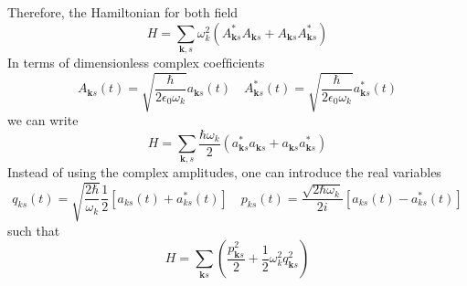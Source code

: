 \documentclass[../../../main.tex]{subfiles}
\begin{document}
Therefore, the  Hamiltonian for both field
\begin{equation*}
  H  = \sum_{\mathbf{k},s}  \omega_k^2 \left( {A}_{\mathbf{k} s}^{*} A_{\mathbf{k} s} + A_{\mathbf{k} s} A_{\mathbf{k} s}^{*} \right)
\end{equation*}
In terms of dimensionless complex coefﬁcients
\begin{equation*}
  A_{\mathbf{k}s}(t)=\sqrt{\frac{\hbar }{2\epsilon_0 \omega_k }} a_{\mathbf{k }s}(t)\quad
  A ^*_{\mathbf{k}s}(t)=\sqrt{\frac{\hbar }{2\epsilon_0 \omega_k }} a_{\mathbf{k }s} ^*(t)
\end{equation*}
we can write
\begin{equation*}
  H = \sum_{\mathbf{k},s} \frac{\hbar \omega_{k}}{2} \left( a_{\mathbf{k} s}^* a_{\mathbf{k} s} + a_{\mathbf{k} s} a_{\mathbf{k} s}^* \right)
\end{equation*}
Instead of using the complex amplitudes, one can introduce the real variables
\begin{equation*}
  q_{ks}(t) = \sqrt{\frac{2\hbar}{\omega_k}}\frac{1}{2} \left[ a_{ks}(t) + a_{ks}^*(t) \right]  \quad
  p_{ks}(t) = \frac{\sqrt{2\hbar \omega_k}  }{2i} \left[ a_{ks}(t) - a_{ks}^*(t) \right]
\end{equation*}
such that
\begin{equation*}
  H = \sum_{\mathbf{ k} s}  \left( \frac{p_{\mathbf{k}s}^{2}}{2} + \frac{1}{2} \omega_{k}^{2} q_{\mathbf{k} s}^{2} \right)
\end{equation*}
\end{document}
